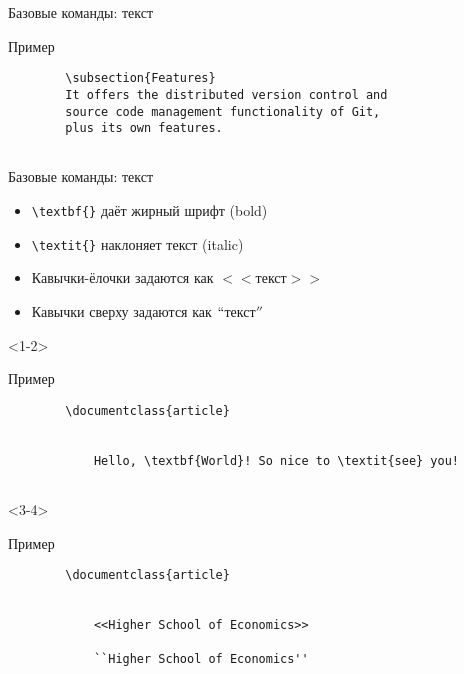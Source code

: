 \begin{frame}[fragile]{Базовые команды: текст}
\begin{onlyenv}
\begin{block}{Пример}
\begin{lstlisting}
        \subsection{Features}
        It offers the distributed version control and 
        source code management functionality of Git, 
        plus its own features.
    
        \end{lstlisting}
    \end{block}
\end{onlyenv}

\end{frame}


\begin{frame}[fragile]{Базовые команды: текст}

\begin{itemize}[<+->]
    \item \lstinline!\textbf{}! даёт жирный шрифт (bold)
    \item \lstinline!\textit{}! наклоняет текст (italic)
    \item Кавычки-ёлочки задаются как $<<$текст$>>$
    \item Кавычки сверху задаются как $``$текст$''$
\end{itemize}

\begin{onlyenv}<1-2>
    \begin{block}{Пример}
        \begin{lstlisting}
        \documentclass{article}
        
        
            Hello, \textbf{World}! So nice to \textit{see} you!
        
        \end{lstlisting}
    \end{block}
\end{onlyenv}

\begin{onlyenv}<3-4>
    \begin{block}{Пример}
        \begin{lstlisting}
        \documentclass{article}
        
        
            <<Higher School of Economics>>
            
            ``Higher School of Economics''
        
        \end{lstlisting}
    \end{block}
\end{onlyenv}

\end{frame}

